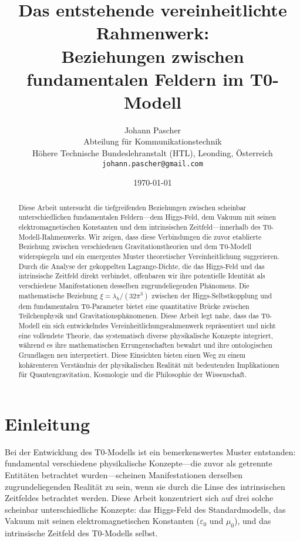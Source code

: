 \documentclass[12pt,a4paper]{article}
\begin{document}
	
	\title{Das entstehende vereinheitlichte Rahmenwerk:\\Beziehungen zwischen fundamentalen Feldern im T0-Modell}
	\author{Johann Pascher\\
		Abteilung für Kommunikationstechnik\\
		Höhere Technische Bundeslehranstalt (HTL), Leonding, Österreich\\
		\texttt{johann.pascher@gmail.com}}
	\date{\today}
	
	\maketitle
	
	\begin{abstract}
		Diese Arbeit untersucht die tiefgreifenden Beziehungen zwischen scheinbar unterschiedlichen fundamentalen Feldern—dem Higgs-Feld, dem Vakuum mit seinen elektromagnetischen Konstanten und dem intrinsischen Zeitfeld—innerhalb des T0-Modell-Rahmenwerks. Wir zeigen, dass diese Verbindungen die zuvor etablierte Beziehung zwischen verschiedenen Gravitationstheorien und dem T0-Modell widerspiegeln und ein emergentes Muster theoretischer Vereinheitlichung suggerieren. Durch die Analyse der gekoppelten Lagrange-Dichte, die das Higgs-Feld und das intrinsische Zeitfeld direkt verbindet, offenbaren wir ihre potentielle Identität als verschiedene Manifestationen desselben zugrundeliegenden Phänomens. Die mathematische Beziehung $\xi = \lambda_h/(32\pi^3)$ zwischen der Higgs-Selbstkopplung und dem fundamentalen T0-Parameter bietet eine quantitative Brücke zwischen Teilchenphysik und Gravitationsphänomenen. Diese Arbeit legt nahe, dass das T0-Modell ein sich entwickelndes Vereinheitlichungsrahmenwerk repräsentiert und nicht eine vollendete Theorie, das systematisch diverse physikalische Konzepte integriert, während es ihre mathematischen Errungenschaften bewahrt und ihre ontologischen Grundlagen neu interpretiert. Diese Einsichten bieten einen Weg zu einem kohärenteren Verständnis der physikalischen Realität mit bedeutenden Implikationen für Quantengravitation, Kosmologie und die Philosophie der Wissenschaft.
	\end{abstract}
	\newpage
	\tableofcontents
	\newpage
	\section{Einleitung}
	\label{sec:introduction}
	
	Bei der Entwicklung des T0-Modells ist ein bemerkenswertes Muster entstanden: fundamental verschiedene physikalische Konzepte—die zuvor als getrennte Entitäten betrachtet wurden—scheinen Manifestationen derselben zugrundeliegenden Realität zu sein, wenn sie durch die Linse des intrinsischen Zeitfeldes betrachtet werden. Diese Arbeit konzentriert sich auf drei solche scheinbar unterschiedliche Konzepte: das Higgs-Feld des Standardmodells, das Vakuum mit seinen elektromagnetischen Konstanten ($\varepsilon_0$ und $\mu_0$), und das intrinsische Zeitfeld des T0-Modells selbst.
	
\end{document}
